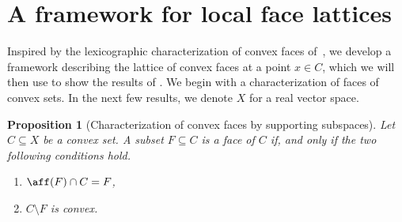 \documentclass{article}
\theoremstyle{plain}
\newtheorem{proposition}{Proposition}[section]
\theoremstyle{definition}
\theoremstyle{remark}
\begin{document}
\section{A framework for local face lattices}
\label{loc:body.a_framework_for_local_face_lattices}
Inspired by the lexicographic characterization of convex faces
of~\cite{martinez-legaz_LEXICOGRAPHICALCHARACTERIZATIONFACES_}, we
develop a framework describing the lattice of convex
faces at a point $x \in C$, which we will then use to show
the results of .
We begin with a characterization of
faces of convex sets. In the next few results, we denote $X$ for
a real vector space.
\begin{proposition}[Characterization of convex faces by supporting subspaces]
\label{loc:characterization_of_convex_faces_by_supporting_subspaces.statement}
Let $C \subseteq X$ be a convex set.
A subset $F \subseteq C$ is a face of $C$ if, and only if
the two following conditions hold.
\begin{enumerate}
\item  $\aff(F) \cap C=F$,
\item $C \setminus F$ is convex.
\end{enumerate}
\end{proposition}
\end{document}
